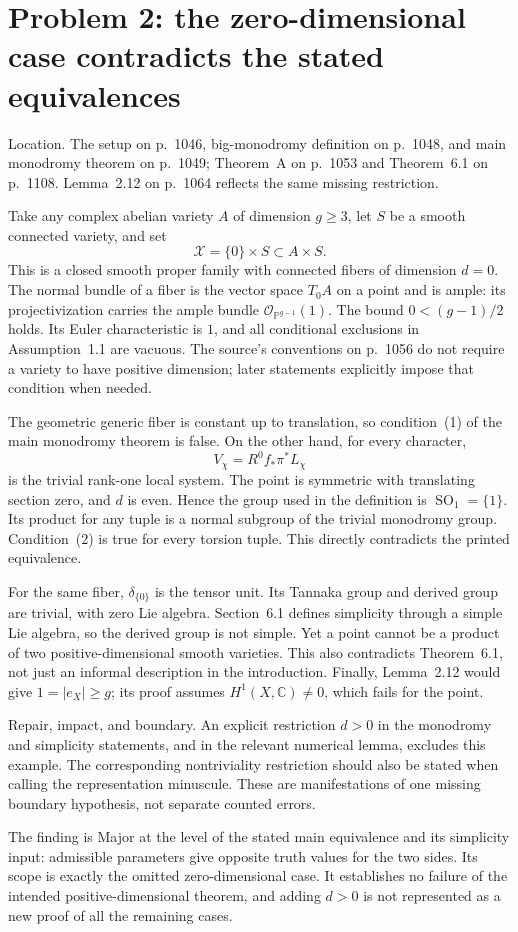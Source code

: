 \documentclass[10pt]{article}
\begin{document}
\section*{Problem 2: the zero-dimensional case contradicts the stated equivalences}
Location. The setup on p. 1046, big-monodromy definition on p. 1048, and main monodromy theorem on p. 1049; Theorem A on p. 1053 and Theorem 6.1 on p. 1108. Lemma 2.12 on p. 1064 reflects the same missing restriction.\par
Take any complex abelian variety \(A\) of dimension \(g\ge3\), let \(S\) be a smooth connected variety, and set \[\mathcal X=\{0\}\times S\subset A\times S.\] This is a closed smooth proper family with connected fibers of dimension \(d=0\). The normal bundle of a fiber is the vector space \(T_0A\) on a point and is ample: its projectivization carries the ample bundle \(\mathcal O_{\mathbb P^{g-1}}(1)\). The bound \(0<(g-1)/2\) holds. Its Euler characteristic is \(1\), and all conditional exclusions in Assumption 1.1 are vacuous. The source’s conventions on p. 1056 do not require a variety to have positive dimension; later statements explicitly impose that condition when needed.\par
The geometric generic fiber is constant up to translation, so condition (1) of the main monodromy theorem is false. On the other hand, for every character, \[V_\chi=R^0f_*\pi^*L_\chi\] is the trivial rank-one local system. The point is symmetric with translating section zero, and \(d\) is even. Hence the group used in the definition is \(\operatorname{SO}_1=\{1\}\). Its product for any tuple is a normal subgroup of the trivial monodromy group. Condition (2) is true for every torsion tuple. This directly contradicts the printed equivalence.\par
For the same fiber, \(\delta_{\{0\}}\) is the tensor unit. Its Tannaka group and derived group are trivial, with zero Lie algebra. Section 6.1 defines simplicity through a simple Lie algebra, so the derived group is not simple. Yet a point cannot be a product of two positive-dimensional smooth varieties. This also contradicts Theorem 6.1, not just an informal description in the introduction. Finally, Lemma 2.12 would give \(1=|e_X|\ge g\); its proof assumes \(H^1(X,\mathbb C)\ne0\), which fails for the point.\par
Repair, impact, and boundary. An explicit restriction \(d>0\) in the monodromy and simplicity statements, and in the relevant numerical lemma, excludes this example. The corresponding nontriviality restriction should also be stated when calling the representation minuscule. These are manifestations of one missing boundary hypothesis, not separate counted errors.\par
The finding is Major at the level of the stated main equivalence and its simplicity input: admissible parameters give opposite truth values for the two sides. Its scope is exactly the omitted zero-dimensional case. It establishes no failure of the intended positive-dimensional theorem, and adding \(d>0\) is not represented as a new proof of all the remaining cases.\par
\end{document}
